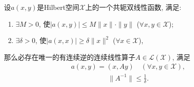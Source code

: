 \documentclass[../../main.tex]{subfiles}%
\begin{document}
\begin{theorem}\label{theorem:泛函分析--Lax-Milgram定理}
设$a(x,y)$是Hilbert空间$\mathscr{X}$上的一个共轭双线性函数, 满足:
\begin{enumerate}[(1)]
\item $\exists M>0$, 使$|a(x,y)|\leqslant M\|x\|\cdot\|y\|$ ($\forall x,y\in\mathscr{X}$);
\item $\exists\delta>0$, 使$|a(x,x)|\geqslant\delta\|x\|^2$ ($\forall x\in\mathscr{X}$),
\end{enumerate}
那么必存在唯一的有连续逆的连续线性算子$A\in\mathscr{L}(\mathscr{X})$, 满足
\begin{align}
a(x,y) = (x,Ay) \quad (\forall x,y\in\mathscr{X}),
\label{eq:HIFHIOW0-3823417}
\end{align}
\begin{align}
\|A^{-1}\| \leqslant \frac{1}{\delta}.
\label{eq:HIFHIOW0-3823418}
\end{align}
\end{theorem}
\end{document}

